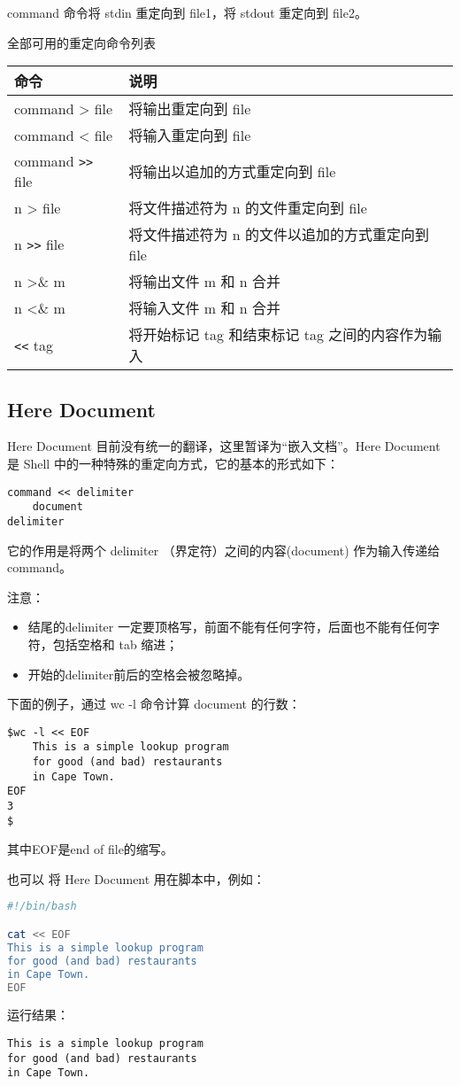 command 命令将 stdin 重定向到 file1，将 stdout 重定向到 file2。


全部可用的重定向命令列表

\begin{center}
\begin{tabular}{l|l}
命令&	说明\\
\hline
command > file	&将输出重定向到 file\\
command < file	&将输入重定向到 file\\
command \verb|>>| file	&将输出以追加的方式重定向到 file\\
n > file	&将文件描述符为 n 的文件重定向到 file\\
n \verb|>>| file	&将文件描述符为 n 的文件以追加的方式重定向到 file\\
n >\& m	&将输出文件 m 和 n 合并\\
n <\& m	&将输入文件 m 和 n 合并\\
\verb|<<| tag	&将开始标记 tag 和结束标记 tag 之间的内容作为输入
\end{tabular}
\end{center}


\subsection{Here Document}
Here Document 目前没有统一的翻译，这里暂译为“嵌入文档”。Here Document 是 Shell 中的一种特殊的重定向方式，它的基本的形式如下：
\begin{verbatim}
command << delimiter
    document
delimiter
\end{verbatim}
它的作用是将两个 delimiter （界定符）之间的内容(document) 作为输入传递给 command。

注意：
\begin{itemize}
\item
结尾的delimiter 一定要顶格写，前面不能有任何字符，后面也不能有任何字符，包括空格和 tab 缩进；
\item
开始的delimiter前后的空格会被忽略掉。
\end{itemize}

下面的例子，通过 wc -l 命令计算 document 的行数：
\begin{verbatim}
$wc -l << EOF
    This is a simple lookup program
    for good (and bad) restaurants
    in Cape Town.
EOF
3
$
\end{verbatim}
其中EOF是end of file的缩写。

也可以 将 Here Document 用在脚本中，例如：
\begin{lstlisting}[language=sh]
#!/bin/bash

cat << EOF
This is a simple lookup program
for good (and bad) restaurants
in Cape Town.
EOF
\end{lstlisting}
运行结果：
\begin{verbatim}
This is a simple lookup program
for good (and bad) restaurants
in Cape Town.
\end{verbatim}

